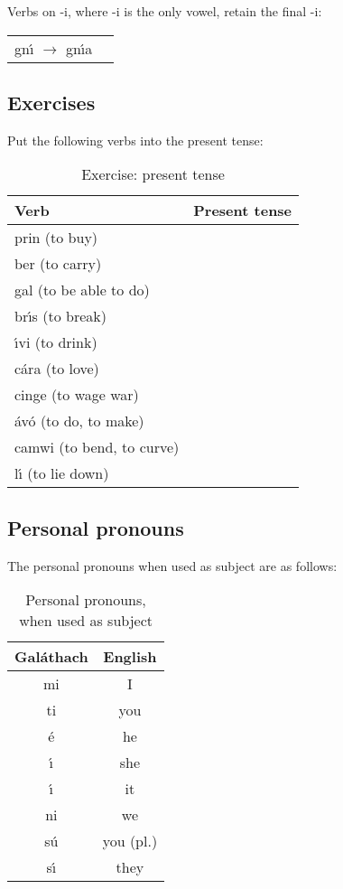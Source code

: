 \noindent Verbs on -i, where -i is the only vowel, retain the final -i:
\begin{table}[H]
\begin{tabu}{ll}
  gn\'{\i} $\rightarrow$ gn\'{\i}a
\end{tabu}
\label{examples_verbs_on_i_only_vowel}
\end{table}

\subsection{Exercises}
\noindent Put the following verbs into the present tense:
\begin{table}[H]
\begin{center}
\begin{tabu}{|l|p{10.0cm}|}
  \toprule
  \textbf{Verb} & \textbf{Present tense}\\
  \toprule
  prin (to buy) & \\
  \midrule
  ber (to carry) & \\
  \midrule
  gal (to be able to do) & \\
  \midrule
  br\'{\i}s (to break) & \\
  \midrule
  \'{\i}vi (to drink) & \\
  \midrule
  c\'{a}ra (to love) & \\
  \midrule
  cinge (to wage war) & \\
  \midrule
  \'{a}v\'{o} (to do, to make) & \\
  \midrule
  camwi (to bend, to curve) & \\
  \midrule
  l\'{\i} (to lie down) & \\
  \bottomrule
\end{tabu}
\end{center}
\caption{Exercise: present tense}
\label{exercise_present_tense}
\end{table}

\subsection{Personal pronouns}

\noindent The personal pronouns when used as subject are as follows:
\begin{table}[H]
\begin{center}
\begin{tabu}{c|c}
  \textbf{Gal\'{a}thach} & \textbf{English}\\
  \toprule
  mi & I \\
  ti & you\\
  \'{e} & he\\
  \'{\i} & she\\
  \'{\i} & it\\
  ni & we\\
  s\'{u} & you (pl.)\\
  s\'{\i} & they\\
\end{tabu}
\end{center}
\caption{Personal pronouns, when used as subject}
\label{personal_pronouns_as_subject}
\end{table}

